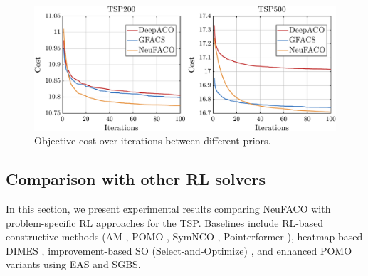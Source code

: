 \documentclass[a4paper,conference]{IEEEtran}
\begin{document}
\begin{figure}[!tb]
  \centering
  \includegraphics[width=\linewidth]{TSP200_vs_TSP500_3lines.pdf}
  \caption{Objective cost over iterations between different priors.}
  \label{fig:over_iterations}
\end{figure}

\subsection{Comparison with other RL solvers}
In this section, we present experimental results comparing NeuFACO with problem-specific RL approaches for the TSP. Baselines include RL-based constructive methods (AM \cite{transformer}, POMO \cite{pomo}, SymNCO \cite{symaco}, Pointerformer \cite{pointerformer}), heatmap-based DIMES \cite{dimes}, improvement-based SO (Select-and-Optimize) \cite{SelectAndOptimize}, and enhanced POMO variants using EAS and SGBS.
\end{document}
